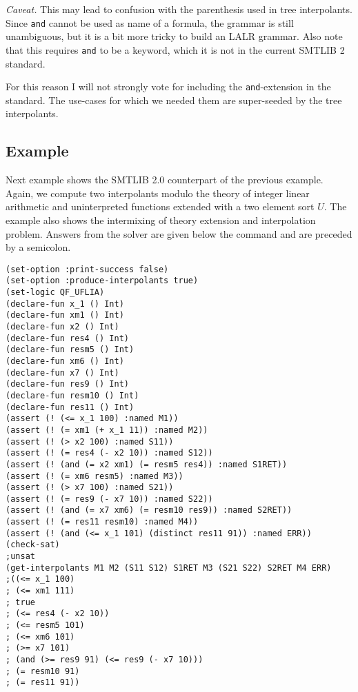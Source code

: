 \documentclass[a4paper,12pt]{article}
\begin{document}
\emph{Caveat.}  This may lead to confusion with the parenthesis used
in tree interpolants.  Since \texttt{and} cannot be used as name of a
formula, the grammar is still unambiguous, but it is a bit more tricky
to build an LALR grammar.  Also note that this requires \texttt{and} to
be a keyword, which it is not in the current SMTLIB 2 standard.  

For this reason I will not strongly vote for including the
\texttt{and}-extension in the standard.  The use-cases for which we
needed them are super-seeded by the tree interpolants.

\subsection*{Example}
Next example shows the SMTLIB 2.0 counterpart of the previous example.
Again, we compute two interpolants modulo the theory of integer linear
arithmetic and uninterpreted functions extended with a two element sort $U$.
The example also shows the intermixing of theory extension and interpolation
problem.
Answers from the solver are given below the command and are preceded by a
semicolon.

{\footnotesize\begin{verbatim}
(set-option :print-success false)
(set-option :produce-interpolants true)
(set-logic QF_UFLIA)
(declare-fun x_1 () Int)
(declare-fun xm1 () Int)
(declare-fun x2 () Int)
(declare-fun res4 () Int)
(declare-fun resm5 () Int)
(declare-fun xm6 () Int)
(declare-fun x7 () Int)
(declare-fun res9 () Int)
(declare-fun resm10 () Int)
(declare-fun res11 () Int)
(assert (! (<= x_1 100) :named M1))
(assert (! (= xm1 (+ x_1 11)) :named M2))
(assert (! (> x2 100) :named S11))
(assert (! (= res4 (- x2 10)) :named S12))
(assert (! (and (= x2 xm1) (= resm5 res4)) :named S1RET))
(assert (! (= xm6 resm5) :named M3))
(assert (! (> x7 100) :named S21))
(assert (! (= res9 (- x7 10)) :named S22))
(assert (! (and (= x7 xm6) (= resm10 res9)) :named S2RET))
(assert (! (= res11 resm10) :named M4))
(assert (! (and (<= x_1 101) (distinct res11 91)) :named ERR))
(check-sat)
;unsat
(get-interpolants M1 M2 (S11 S12) S1RET M3 (S21 S22) S2RET M4 ERR)
;((<= x_1 100)
; (<= xm1 111)
; true
; (<= res4 (- x2 10))
; (<= resm5 101)
; (<= xm6 101)
; (>= x7 101)
; (and (>= res9 91) (<= res9 (- x7 10)))
; (= resm10 91)
; (= res11 91))
\end{verbatim}}
\end{document}
